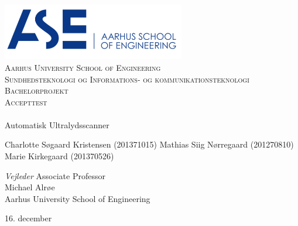 \begin{titlingpage}
\begin{center}

~ \\[3cm]

\includegraphics[width=0.6\textwidth]{figurer/ASE}~\\[1cm]

\textsc{\LARGE Aarhus University School of Engineering}\\[1.5cm]

\textsc{\Large Sundhedsteknologi og Informations- og kommunikationsteknologi}\\

\textsc{\Large Bachelorprojekt}\\[0.5cm]

\textsc{\Large Accepttest} \\[1cm]

\noindent\makebox[\linewidth]{\rule{\textwidth}{0.4pt}}\\
[0.5cm]{\Huge Automatisk Ultralydsscanner}
\noindent\makebox[\linewidth]{\rule{\textwidth}{0.4pt}}

\end{center}

Charlotte Søgaard Kristensen (201371015) \newline
Mathias Siig Nørregaard  (201270810)\newline		 
Marie Kirkegaard (201370526) \newline  


\textit{Vejleder} \newline
Associate Professor\\
Michael Alrøe\\
Aarhus University School of Engineering


\vfill

\begin{center}
{\large 16. december}
\end{center}

\end{titlingpage}
